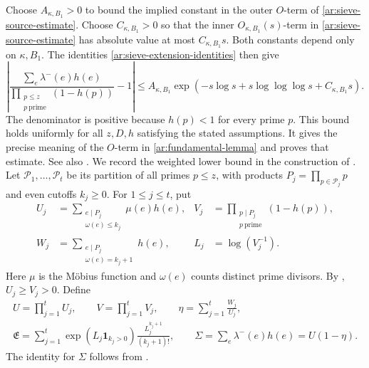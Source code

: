 \documentclass[twoside]{aomart}
\theoremstyle{paperplain}
\theoremstyle{paperdefinition}
\numberwithin{equation}{section}
\begin{document}
Choose $A_{\kappa,B_1}>0$ to bound the implied constant in
the outer $O$-term of \eqref{ar:sieve-source-estimate}.
Choose $C_{\kappa,B_1}>0$ so that the inner $O_{\kappa,B_1}(s)$-term
in \eqref{ar:sieve-source-estimate} has absolute value at most
$C_{\kappa,B_1}s$.
Both constants depend only on $\kappa,B_1$.
The identities \eqref{ar:sieve-extension-identities} then give
\begin{equation}
 \left|
 \frac{\sum_e\lambda^-(e)h(e)}{\prod_{\substack{p\le z\\p\ \mathrm{prime}}}(1-h(p))}-1
 \right|
 \le A_{\kappa,B_1}
 \exp\!\left(-s\log s+s\log\log\log s+C_{\kappa,B_1}s\right).
 \label{ar:sieve-relative-error}
\end{equation}
The denominator is positive because $h(p)<1$ for every prime $p$.
This bound holds uniformly for all $z,D,h$ satisfying the stated
assumptions. It gives the precise meaning of the $O$-term in
\eqref{ar:fundamental-lemma} and proves that estimate.
See also \cite[Proposition~3.1]{Gorodetsky}.
We record the weighted lower bound in the construction of
\cite[Theorem~3.6(a), pp.~38--39]{FordSieve2023}.
Let $\mathcal P_1,\ldots,\mathcal P_t$ be its partition of all primes
$p\le z$, with products $P_j=\prod_{p\in\mathcal P_j}p$ and even cutoffs
$k_j\ge0$. For $1\le j\le t$, put
\begin{equation}
 \begin{aligned}
 U_j&=\sum_{\substack{e\mid P_j\\\omega(e)\le k_j}}\mu(e)h(e),
 &V_j&=\prod_{\substack{p\mid P_j\\p\ \mathrm{prime}}}(1-h(p)),\\
 W_j&=\sum_{\substack{e\mid P_j\\\omega(e)=k_j+1}}h(e),
 &L_j&=\log(V_j^{-1}).
 \end{aligned}
\end{equation}
Here $\mu$ is the M\"obius function and $\omega(e)$ counts distinct
prime divisors. By \cite[p.~17]{FordSieve2023}, $U_j\ge V_j>0$.
Define
\begin{equation}
 \begin{gathered}
 U=\prod_{j=1}^tU_j,\qquad V=\prod_{j=1}^tV_j,
 \qquad \eta=\sum_{j=1}^t\frac{W_j}{U_j},\\
 \mathfrak E=\sum_{j=1}^t
    \exp(L_j\mathbf1_{k_j>0})\frac{L_j^{k_j+1}}{(k_j+1)!},
 \qquad \Sigma=\sum_e\lambda^-(e)h(e)=U(1-\eta).
 \end{gathered}
\end{equation}
The identity for $\Sigma$ follows from
\cite[(3.2), p.~30]{FordSieve2023}.
\end{document}
